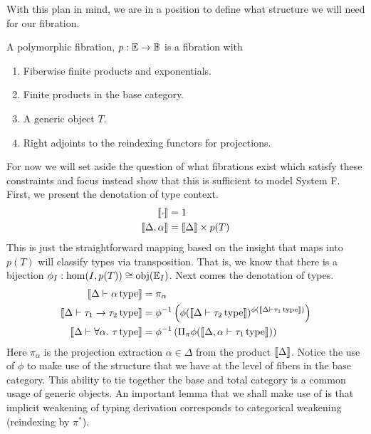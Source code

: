 With this plan in mind, we are in a position to define what structure
we will need for our fibration.
\begin{defn}\label{defn:systemf:polymorphicfibration}
  A polymorphic fibration, $p : \mathbb{E} \to \mathbb{B}$ is a fibration with
  \begin{enumerate}
  \item Fiberwise finite products and exponentials.
  \item Finite products in the base category.
  \item A generic object $T$.
  \item Right adjoints to the reindexing functors for projections.
  \end{enumerate}
\end{defn}
For now we will set aside the question of what fibrations exist which
satisfy these constraints and focus instead show that this is
sufficient to model System F. First, we present the denotation of
type context.
\begin{align*}
  \llbracket \cdot \rrbracket &= 1\\
  \llbracket \Delta, \alpha \rrbracket &= \llbracket \Delta \rrbracket \times p(T)
\end{align*}
This is just the straightforward mapping based on the insight that
maps into $p(T)$ will classify types via transposition. That is, we
know that there is a bijection
$\phi_I : \hom(I, p(T)) \cong \operatorname{obj}(\mathbb{E}_I)$.  Next comes the denotation
of types.
\begin{align*}
  \llbracket \Delta \vdash \alpha\,\mathrm{type} \rrbracket &= \pi_{\alpha}\\
  \llbracket \Delta \vdash \tau_1 \to \tau_2\,\mathrm{type} \rrbracket &=
  \phi^{-1}\left(\phi(\llbracket \Delta \vdash \tau_2\,\mathrm{type} \rrbracket)^{\phi(\llbracket \Delta \vdash \tau_1\,\mathrm{type} \rrbracket)}\right)\\
  \llbracket \Delta \vdash \forall \alpha.\ \tau\,\mathrm{type} \rrbracket &=
  \phi^{-1}\left(\Pi_{\pi}\phi(\llbracket \Delta, \alpha \vdash \tau_1\,\mathrm{type} \rrbracket)\right)
\end{align*}
Here $\pi_{\alpha}$ is the projection extraction $\alpha \in \Delta$
from the product $\llbracket \Delta \rrbracket$. Notice the use of $\phi$ to make
use of the structure that we have at the level of fibers in the base
category. This ability to tie together the base and total category is
a common usage of generic objects. An important lemma that we shall
make use of is that implicit weakening of typing derivation
corresponds to categorical weakening (reindexing by $\pi^*$).

